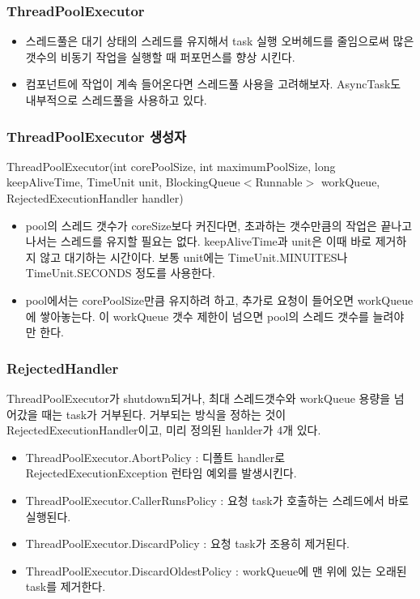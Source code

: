 \documentclass{beamer}
\begin{document}
\begin{frame}
\frametitle{ThreadPoolExecutor}
\begin{itemize}
\item 스레드풀은 대기 상태의 스레드를 유지해서 task 실행 오버헤드를 줄임으로써 많은 갯수의 비동기 작업을 실행할 때 퍼포먼스를 향상 시킨다. 
\item 컴포넌트에 작업이 계속 들어온다면 스레드풀 사용을 고려해보자. AsyncTask도 내부적으로 스레드풀을 사용하고 있다.
\end{itemize}
\end{frame}

\begin{frame}
\frametitle{ThreadPoolExecutor 생성자}
ThreadPoolExecutor(int corePoolSize, int maximumPoolSize, long keepAliveTime, TimeUnit unit, BlockingQueue$<$Runnable$>$ workQueue, RejectedExecutionHandler handler)
\begin{itemize}
\item pool의 스레드 갯수가 coreSize보다 커진다면, 초과하는 갯수만큼의 작업은 끝나고 나서는 스레드를 유지할 필요는 없다. keepAliveTime과 unit은 이때 바로 제거하지 않고 대기하는 시간이다. 보통 unit에는 TimeUnit.MINUITES나 TimeUnit.SECONDS 정도를 사용한다. 
\item pool에서는 corePoolSize만큼 유지하려 하고, 추가로 요청이 들어오면 workQueue에 쌓아놓는다. 이 workQueue 갯수 제한이 넘으면 pool의 스레드 갯수를 늘려야만 한다. 
\end{itemize}
\end{frame}

\begin{frame}
\frametitle{RejectedHandler}
ThreadPoolExecutor가 shutdown되거나, 최대 스레드갯수와 workQueue 용량을 넘어갔을 때는 task가 거부된다. 거부되는 방식을 정하는 것이 RejectedExecutionHandler이고, 미리 정의된 hanlder가 4개 있다.
\begin{itemize}
\item ThreadPoolExecutor.AbortPolicy : 디폴트 handler로 RejectedExecutionException 런타임 예외를 발생시킨다.
\item ThreadPoolExecutor.CallerRunsPolicy : 요청 task가 호출하는 스레드에서 바로 실행된다. 
\item ThreadPoolExecutor.DiscardPolicy : 요청 task가 조용히 제거된다.
\item ThreadPoolExecutor.DiscardOldestPolicy : workQueue에 맨 위에 있는 오래된 task를 제거한다.
\end{itemize}

\end{frame}
\end{document}
